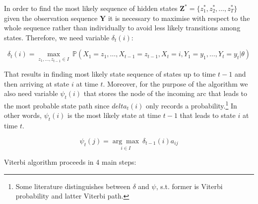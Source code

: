 In order to find the most likely sequence of hidden states $\textbf{Z}^*=\{z_1^*,z_2^*,\ldots,z_T^*\}$ given the observation sequence $\textbf{Y}$ it is necessary 
to maximise with respect to the whole sequence rather than individually to avoid less likely transitions among states.
Therefore, we need variable $\delta_t(i)$:

\begin{equation}
    \delta_t(i) = \underset{z_1,\ldots,z_{t-1} \in I}{\max}\: \mathbb{P}(X_1=z_1,\ldots,X_{t-1}=z_{t-1},X_t=i,Y_1 = y_1,\ldots,Y_{t}=y_t|\theta)
\end{equation}

That results in finding most likely state sequence of states up to time $t-1$ and then arriving at state $i$ at time $t$. Moreover, for the purpose of the algorithm we also need variable $\psi_t(i)$ 
that stores the node of the incoming arc that leads to the most probable state path since $delta_t(i)$ only records a probability.\footnote{Some literature distinguishes between $\delta$ and $\psi$, s.t. former is Viterbi probability and latter Viterbi path.} 
In other words, $\psi_t(i)$ is the most likely state at time $t-1$ that leads to state $i$ at time $t$.

\begin{equation}
\psi_t(j) = \underset{i \in I}{\arg\max} \: \delta_{t-1}(i)a_{ij}
\end{equation}

\noindent Viterbi algorithm proceeds in 4 main steps:

